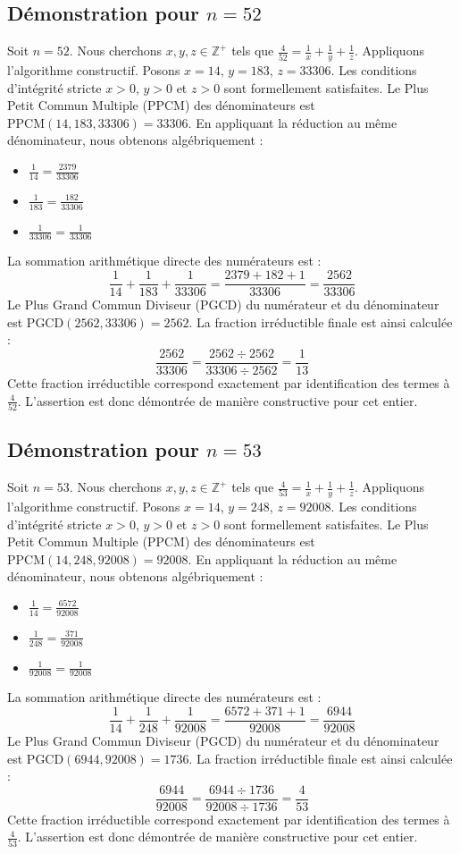 \documentclass[11pt,a4paper]{article}
\begin{document}
\subsection{Démonstration pour $n = 52$}
Soit $n = 52$. Nous cherchons $x, y, z \in \mathbb{Z}^{+}$ tels que $\frac{4}{52} = \frac{1}{x} + \frac{1}{y} + \frac{1}{z}$.
Appliquons l'algorithme constructif. Posons $x = 14$, $y = 183$, $z = 33306$.
Les conditions d'intégrité stricte $x > 0$, $y > 0$ et $z > 0$ sont formellement satisfaites.
Le Plus Petit Commun Multiple (PPCM) des dénominateurs est $\text{PPCM}(14, 183, 33306) = 33306$.
En appliquant la réduction au même dénominateur, nous obtenons algébriquement :
\begin{itemize}
    \item $\frac{1}{14} = \frac{2379}{33306}$
    \item $\frac{1}{183} = \frac{182}{33306}$
    \item $\frac{1}{33306} = \frac{1}{33306}$
\end{itemize}
La sommation arithmétique directe des numérateurs est :
$$ \frac{1}{14} + \frac{1}{183} + \frac{1}{33306} = \frac{2379 + 182 + 1}{33306} = \frac{2562}{33306} $$
Le Plus Grand Commun Diviseur (PGCD) du numérateur et du dénominateur est $\text{PGCD}(2562, 33306) = 2562$.
La fraction irréductible finale est ainsi calculée :
$$ \frac{2562}{33306} = \frac{2562 \div 2562}{33306 \div 2562} = \frac{1}{13} $$
Cette fraction irréductible correspond exactement par identification des termes à $\frac{4}{52}$. L'assertion est donc démontrée de manière constructive pour cet entier.

\subsection{Démonstration pour $n = 53$}
Soit $n = 53$. Nous cherchons $x, y, z \in \mathbb{Z}^{+}$ tels que $\frac{4}{53} = \frac{1}{x} + \frac{1}{y} + \frac{1}{z}$.
Appliquons l'algorithme constructif. Posons $x = 14$, $y = 248$, $z = 92008$.
Les conditions d'intégrité stricte $x > 0$, $y > 0$ et $z > 0$ sont formellement satisfaites.
Le Plus Petit Commun Multiple (PPCM) des dénominateurs est $\text{PPCM}(14, 248, 92008) = 92008$.
En appliquant la réduction au même dénominateur, nous obtenons algébriquement :
\begin{itemize}
    \item $\frac{1}{14} = \frac{6572}{92008}$
    \item $\frac{1}{248} = \frac{371}{92008}$
    \item $\frac{1}{92008} = \frac{1}{92008}$
\end{itemize}
La sommation arithmétique directe des numérateurs est :
$$ \frac{1}{14} + \frac{1}{248} + \frac{1}{92008} = \frac{6572 + 371 + 1}{92008} = \frac{6944}{92008} $$
Le Plus Grand Commun Diviseur (PGCD) du numérateur et du dénominateur est $\text{PGCD}(6944, 92008) = 1736$.
La fraction irréductible finale est ainsi calculée :
$$ \frac{6944}{92008} = \frac{6944 \div 1736}{92008 \div 1736} = \frac{4}{53} $$
Cette fraction irréductible correspond exactement par identification des termes à $\frac{4}{53}$. L'assertion est donc démontrée de manière constructive pour cet entier.
\end{document}
